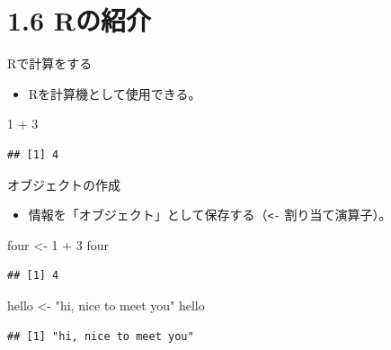 \documentclass[
  ignorenonframetext,
]{beamer}
\newenvironment{Shaded}{\begin{snugshade}}{\end{snugshade}}
\newcommand{\DecValTok}[1]{\textcolor[rgb]{0.00,0.00,0.81}{#1}}
\newcommand{\NormalTok}[1]{#1}
\newcommand{\OtherTok}[1]{\textcolor[rgb]{0.56,0.35,0.01}{#1}}
\newcommand{\SpecialCharTok}[1]{\textcolor[rgb]{0.00,0.00,0.00}{#1}}
\newcommand{\StringTok}[1]{\textcolor[rgb]{0.31,0.60,0.02}{#1}}
\providecommand{\tightlist}{%
  \setlength{\itemsep}{0pt}\setlength{\parskip}{0pt}}
\begin{document}
\hypertarget{rux306eux7d39ux4ecb}{%
\section{1.6 Rの紹介}\label{rux306eux7d39ux4ecb}}

\begin{frame}[fragile]{Rで計算をする}
\protect\hypertarget{rux3067ux8a08ux7b97ux3092ux3059ux308b}{}
\begin{itemize}
\tightlist
\item
  Rを計算機として使用できる。
\end{itemize}

\begin{Shaded}
\begin{Highlighting}[]
\DecValTok{1} \SpecialCharTok{+} \DecValTok{3}
\end{Highlighting}
\end{Shaded}

\begin{verbatim}
## [1] 4
\end{verbatim}
\end{frame}

\begin{frame}[fragile]{オブジェクトの作成}
\protect\hypertarget{ux30aaux30d6ux30b8ux30a7ux30afux30c8ux306eux4f5cux6210}{}
\begin{itemize}
\tightlist
\item
  情報を「オブジェクト」として保存する（\texttt{\textless{}-}
  割り当て演算子）。
\end{itemize}

\begin{Shaded}
\begin{Highlighting}[]
\NormalTok{four }\OtherTok{\textless{}{-}} \DecValTok{1} \SpecialCharTok{+} \DecValTok{3}
\NormalTok{four}
\end{Highlighting}
\end{Shaded}

\begin{verbatim}
## [1] 4
\end{verbatim}

\begin{Shaded}
\begin{Highlighting}[]
\NormalTok{hello }\OtherTok{\textless{}{-}} \StringTok{"hi, nice to meet you"}
\NormalTok{hello}
\end{Highlighting}
\end{Shaded}

\begin{verbatim}
## [1] "hi, nice to meet you"
\end{verbatim}
\end{frame}
\end{document}
